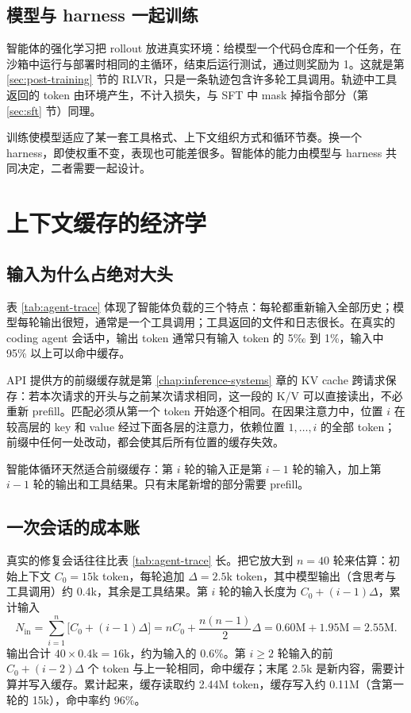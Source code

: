 \subsection{模型与 harness 一起训练}

智能体的强化学习把 rollout 放进真实环境：给模型一个代码仓库和一个任务，在沙箱中运行与部署时相同的主循环，结束后运行测试，通过则奖励为 1。这就是第 \ref{sec:post-training} 节的 RLVR，只是一条轨迹包含许多轮工具调用。轨迹中工具返回的 token 由环境产生，不计入损失，与 SFT 中 mask 掉指令部分（第 \ref{sec:sft} 节）同理。

训练使模型适应了某一套工具格式、上下文组织方式和循环节奏。换一个 harness，即使权重不变，表现也可能差很多。智能体的能力由模型与 harness 共同决定，二者需要一起设计。

\section{上下文缓存的经济学}
\label{sec:agent-cache}

\subsection{输入为什么占绝对大头}

表 \ref{tab:agent-trace} 体现了智能体负载的三个特点：每轮都重新输入全部历史；模型每轮输出很短，通常是一个工具调用；工具返回的文件和日志很长。在真实的 coding agent 会话中，输出 token 通常只有输入 token 的 5‰ 到 1\%，输入中 95\% 以上可以命中缓存。

API 提供方的前缀缓存就是第 \ref{chap:inference-systems} 章的 KV cache 跨请求保存：若本次请求的开头与之前某次请求相同，这一段的 K/V 可以直接读出，不必重新 prefill。匹配必须从第一个 token 开始逐个相同。在因果注意力中，位置 \(i\) 在较高层的 key 和 value 经过下面各层的注意力，依赖位置 \(1,\ldots,i\) 的全部 token；前缀中任何一处改动，都会使其后所有位置的缓存失效。

智能体循环天然适合前缀缓存：第 \(i\) 轮的输入正是第 \(i-1\) 轮的输入，加上第 \(i-1\) 轮的输出和工具结果。只有末尾新增的部分需要 prefill。

\subsection{一次会话的成本账}

真实的修复会话往往比表 \ref{tab:agent-trace} 长。把它放大到 \(n=40\) 轮来估算：初始上下文 \(C_0=15\)k token，每轮追加 \(\Delta=2.5\)k token，其中模型输出（含思考与工具调用）约 0.4k，其余是工具结果。第 \(i\) 轮的输入长度为 \(C_0+(i-1)\Delta\)，累计输入
\begin{equation}
 N_{\mathrm{in}}=\sum_{i=1}^{n}\bigl[C_0+(i-1)\Delta\bigr]=nC_0+\frac{n(n-1)}{2}\Delta
 =0.60\text{M}+1.95\text{M}=2.55\text{M}.
 \label{eq:agent-input-total}
\end{equation}
输出合计 \(40\times0.4\text{k}=16\text{k}\)，约为输入的 0.6\%。第 \(i\ge2\) 轮输入的前 \(C_0+(i-2)\Delta\) 个 token 与上一轮相同，命中缓存；末尾 2.5k 是新内容，需要计算并写入缓存。累计起来，缓存读取约 2.44M token，缓存写入约 0.11M（含第一轮的 15k），命中率约 96\%。

